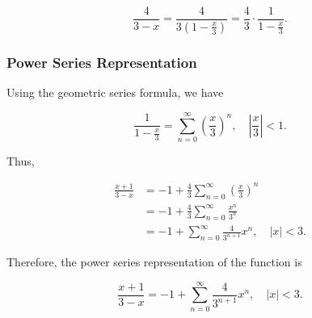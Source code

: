 \[
    \frac{4}{3 - x} = \frac{4}{3(1 - \frac{x}{3})} = \frac{4}{3} \cdot \frac{1}{1 - \frac{x}{3}}.
\]

\subsubsection{Power Series Representation}

Using the geometric series formula, we have

\[
    \frac{1}{1 - \frac{x}{3}} = \sum_{n=0}^{\infty} {\left( \frac{x}{3} \right)}^n, \quad \left| \frac{x}{3} \right| < 1.
\]

Thus,

\begin{align*}
    \frac{x + 1}{3 - x} &= -1 + \frac{4}{3} \sum_{n=0}^{\infty} {\left( \frac{x}{3} \right)}^n \\
    &= -1 + \frac{4}{3} \sum_{n=0}^{\infty} \frac{x^n}{3^n} \\
    &= -1 + \sum_{n=0}^{\infty} \frac{4}{3^{n+1}} x^n, \quad |x| < 3.
\end{align*}

Therefore, the power series representation of the function is

\[
    \frac{x + 1}{3 - x} = -1 + \sum_{n=0}^{\infty} \frac{4}{3^{n+1}} x^n, \quad |x| < 3.
\]
